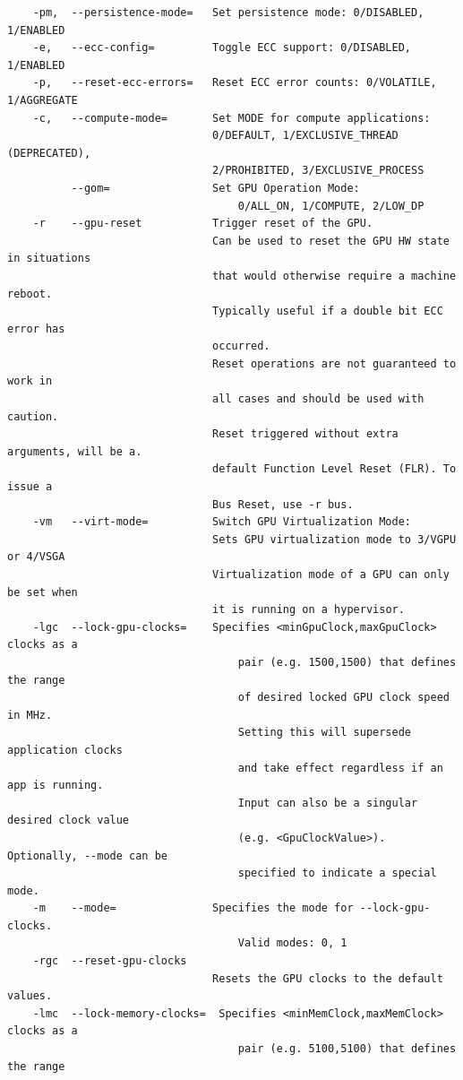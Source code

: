 \begin{lstlisting}
    -pm,  --persistence-mode=   Set persistence mode: 0/DISABLED, 1/ENABLED
    -e,   --ecc-config=         Toggle ECC support: 0/DISABLED, 1/ENABLED
    -p,   --reset-ecc-errors=   Reset ECC error counts: 0/VOLATILE, 1/AGGREGATE
    -c,   --compute-mode=       Set MODE for compute applications:
                                0/DEFAULT, 1/EXCLUSIVE_THREAD (DEPRECATED),
                                2/PROHIBITED, 3/EXCLUSIVE_PROCESS
          --gom=                Set GPU Operation Mode:
                                    0/ALL_ON, 1/COMPUTE, 2/LOW_DP
    -r    --gpu-reset           Trigger reset of the GPU.
                                Can be used to reset the GPU HW state in situations
                                that would otherwise require a machine reboot.
                                Typically useful if a double bit ECC error has
                                occurred.
                                Reset operations are not guaranteed to work in
                                all cases and should be used with caution.
                                Reset triggered without extra arguments, will be a.
                                default Function Level Reset (FLR). To issue a
                                Bus Reset, use -r bus.
    -vm   --virt-mode=          Switch GPU Virtualization Mode:
                                Sets GPU virtualization mode to 3/VGPU or 4/VSGA
                                Virtualization mode of a GPU can only be set when
                                it is running on a hypervisor.
    -lgc  --lock-gpu-clocks=    Specifies <minGpuClock,maxGpuClock> clocks as a
                                    pair (e.g. 1500,1500) that defines the range
                                    of desired locked GPU clock speed in MHz.
                                    Setting this will supersede application clocks
                                    and take effect regardless if an app is running.
                                    Input can also be a singular desired clock value
                                    (e.g. <GpuClockValue>). Optionally, --mode can be
                                    specified to indicate a special mode.
    -m    --mode=               Specifies the mode for --lock-gpu-clocks.
                                    Valid modes: 0, 1
    -rgc  --reset-gpu-clocks
                                Resets the GPU clocks to the default values.
    -lmc  --lock-memory-clocks=  Specifies <minMemClock,maxMemClock> clocks as a
                                    pair (e.g. 5100,5100) that defines the range

\end{lstlisting}
